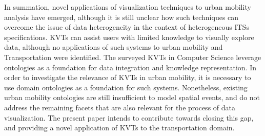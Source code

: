 \documentclass[]{interact}
\theoremstyle{plain}%
\theoremstyle{definition}
\theoremstyle{remark}
\theoremstyle{definition}
\begin{document}




In summation, novel applications of visualization techniques to urban mobility analysis have emerged, although it is still unclear how such techniques can overcome the issue of data heterogeneity in the context of heterogeneous ITSs specifications. KVTs can assist users with limited knowledge to visually explore data, although no applications of such systems to urban mobility and Transportation were identified. The surveyed KVTs in Computer Science leverage ontologies as a foundation for data integration and knowledge representation. In order to investigate the relevance of KVTs in urban mobility, it is necessary to use domain ontologies as a foundation for such systems. Nonetheless, existing urban mobility ontologies are still insufficient to model spatial events, and do not address the remaining facets that are also relevant for the process of data visualization. The present paper intends to contribute towards closing this gap, and providing a novel application of KVTs to the transportation domain.
\end{document}
